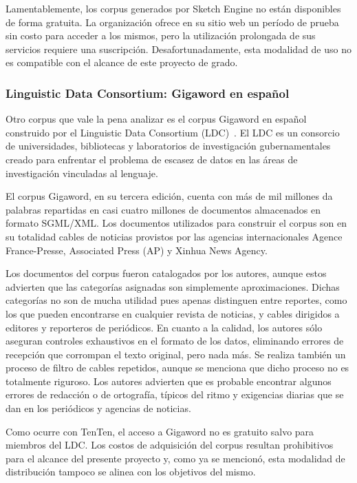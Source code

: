 Lamentablemente, los corpus generados por Sketch Engine no están disponibles de forma gratuita. La
organización ofrece en su sitio web un período de prueba sin costo para acceder a los mismos, pero la
utilización prolongada de sus servicios requiere una suscripción. Desafortunadamente, esta modalidad de
uso no es compatible con el alcance de este proyecto de grado.

\subsubsection{Linguistic Data Consortium: Gigaword en español}

Otro corpus que vale la pena analizar es el corpus Gigaword en español construido por el Linguistic Data
Consortium (LDC)~\cite{GigawordES}. El LDC es un consorcio de universidades, bibliotecas y laboratorios de
investigación gubernamentales creado para enfrentar el problema de escasez de datos en las áreas de
investigación vinculadas al lenguaje.

El corpus Gigaword, en su tercera edición, cuenta con más de mil millones da palabras repartidas en casi
cuatro millones de documentos almacenados en formato SGML/XML. Los documentos utilizados para construir el
corpus son en su totalidad cables de noticias provistos por las agencias internacionales Agence France-Presse,
Associated Press (AP) y Xinhua News Agency.

Los documentos del corpus fueron catalogados por los autores, aunque estos advierten que las categorías
asignadas son simplemente aproximaciones. Dichas categorías no son de mucha utilidad pues apenas
distinguen entre reportes, como los que pueden encontrarse en cualquier revista de noticias, y cables
dirigidos a editores y reporteros de periódicos. En cuanto a la calidad, los autores sólo aseguran
controles exhaustivos en el formato de los datos, eliminando errores de recepción que corrompan el
texto original, pero nada más. Se realiza también un proceso de filtro de cables repetidos, aunque se
menciona que dicho proceso no es totalmente riguroso. Los autores advierten que es probable encontrar
algunos errores de redacción o de ortografía, típicos del ritmo y exigencias diarias que se dan en los
periódicos y agencias de noticias.

Como ocurre con TenTen, el acceso a Gigaword no es gratuito salvo para miembros del LDC. Los costos de
adquisición del corpus resultan prohibitivos para el alcance del presente proyecto y, como ya se mencionó,
esta modalidad de distribución tampoco se alinea con los objetivos del mismo.


